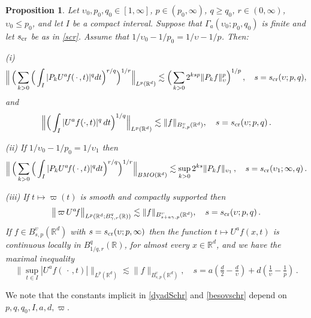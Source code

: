 \documentclass[11pt]{amsart}
\newtheorem{proposition}[theorem]{Proposition}
\theoremstyle{definition}
\numberwithin{theorem}{section}
\numberwithin{definition}{section}
\renewcommand{\wp}{\upsilon}
\def\scr{{s_{{\text{\rm cr}}}}}
\newcommand{\Be}{\begin{equation}}
\newcommand{\Ee}{\end{equation}}
\newcommand{\note}[1]{\footnote{\texttt{\Small #1}}}
\def\lc{\lesssim}
\def\bbR{{\mathbb {R}}}
\begin{document}
\begin{proposition}\label{combin} Let $\wp_0,p_0,q_0\in[1,\infty]$,
$p\in(p_0,\infty)$, $q\ge  q_0$, $r\in (0,\infty)$, $\wp_0\le p_0$,  and let $I$ be a compact interval.
Suppose that $\Gamma_a(\wp_0;p_0,q_0)$
 is finite
and let $\scr$ be as in \eqref{scr}.
Assume that $1/\wp_0-1/p_0=1/\wp-1/p$.
Then:

(i)
\begin{equation}\label{dyadSchr}
\Big\|\, \Big(\sum_{k>0} \Big(\int_I |P_k U^a\!f(\,\cdot\,,t) |^q dt\Big)^{r/q}\Big)^{1/r}
\Big\|_{L^p(\mathbb{R}^d)} \lc
\Big(\sum_{k>0} 2^{ksp}\|P_k f\|_{\wp}^p\Big)^{1/p}\, ,\quad s=\scr(\wp;p,q),
\end{equation}
and
\Be\label{besovmixednormest}
\Big\|\Big(\int_I|U^af(\cdot,t)|^q\,dt\Big)^{1/q}\Big\|_{L^p(\bbR^d)}
\lc \|f\|_{B^\wp_{s,p}(\bbR^d)}, \quad s=\scr(\wp;p,q)\,.
\Ee

(ii) If $1/\wp_0-1/p_0=1/\wp_1$ then
\begin{equation}\label{dyadSchrbmo}
\Big\|\, \Big(\sum_{k>0} \Big(\int_I |P_k U^a\!f(\,\cdot\,,t) |^q dt\Big)^{r/q}\Big)^{1/r}
\Big\|_{BMO(\mathbb{R}^d)} \lc
\sup_{k>0} 2^{ks}\|P_k f\|_{\wp_1}\,,\quad s=\scr(\wp_1;\infty,q)\,.
\end{equation}

(iii) If $t\mapsto \varpi(t)$ is smooth and compactly supported
 then
\begin{equation}\label{besovschr}
\big\|\, \varpi\,U^a \!f \big\|_{L^p(\bbR^d;B^q_{\gamma,r}(\bbR))}
 \lc
\|f\|_{B^\wp_{s+a\gamma,p}(\bbR^d)}, \quad s= \scr(\wp;p,q)\,.
\end{equation}
If $f\in B^\wp_{s,p}(\bbR^d)$ with  $s= \scr(\wp;p,\infty)$
then the function $t\mapsto U^a f(x,t)$
is continuous   locally in $B^q_{1/q,r}(\bbR)$,
for almost every $x\in \bbR^d$,
 and we have the maximal inequality
\begin{equation}
\label{max}
\big\|\sup_{t\in I} |U^a \!f(\,\cdot\,,t)|  \big\|_{L^p(\bbR^d)}
 \lc
\|f\|_{B^\wp_{s,p}(\bbR^d)}, \quad s=
a(\tfrac d2-\tfrac d{\wp})+
d(\tfrac 1{\wp}-\tfrac 1p)\,.
\end{equation}



\end{proposition}
We note that the  constants implicit in \eqref{dyadSchr} and \eqref{besovschr}
depend on $p, q, q_0, I, a,d, \varpi$.
\end{document}
